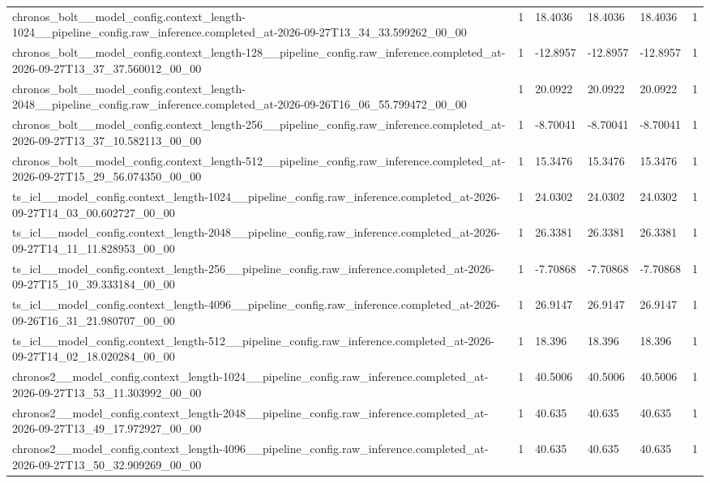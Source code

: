 \begin{tabular}{llllll}
chronos\_bolt\_\_model\_config.context\_length-1024\_\_pipeline\_config.raw\_inference.completed\_at-2026-09-27T13\_34\_33.599262\_00\_00 & 1 & 18.4036 & 18.4036 & 18.4036 & 1 \\
chronos\_bolt\_\_model\_config.context\_length-128\_\_pipeline\_config.raw\_inference.completed\_at-2026-09-27T13\_37\_37.560012\_00\_00 & 1 & -12.8957 & -12.8957 & -12.8957 & 1 \\
chronos\_bolt\_\_model\_config.context\_length-2048\_\_pipeline\_config.raw\_inference.completed\_at-2026-09-26T16\_06\_55.799472\_00\_00 & 1 & 20.0922 & 20.0922 & 20.0922 & 1 \\
chronos\_bolt\_\_model\_config.context\_length-256\_\_pipeline\_config.raw\_inference.completed\_at-2026-09-27T13\_37\_10.582113\_00\_00 & 1 & -8.70041 & -8.70041 & -8.70041 & 1 \\
chronos\_bolt\_\_model\_config.context\_length-512\_\_pipeline\_config.raw\_inference.completed\_at-2026-09-27T15\_29\_56.074350\_00\_00 & 1 & 15.3476 & 15.3476 & 15.3476 & 1 \\
ts\_icl\_\_model\_config.context\_length-1024\_\_pipeline\_config.raw\_inference.completed\_at-2026-09-27T14\_03\_00.602727\_00\_00 & 1 & 24.0302 & 24.0302 & 24.0302 & 1 \\
ts\_icl\_\_model\_config.context\_length-2048\_\_pipeline\_config.raw\_inference.completed\_at-2026-09-27T14\_11\_11.828953\_00\_00 & 1 & 26.3381 & 26.3381 & 26.3381 & 1 \\
ts\_icl\_\_model\_config.context\_length-256\_\_pipeline\_config.raw\_inference.completed\_at-2026-09-27T15\_10\_39.333184\_00\_00 & 1 & -7.70868 & -7.70868 & -7.70868 & 1 \\
ts\_icl\_\_model\_config.context\_length-4096\_\_pipeline\_config.raw\_inference.completed\_at-2026-09-26T16\_31\_21.980707\_00\_00 & 1 & 26.9147 & 26.9147 & 26.9147 & 1 \\
ts\_icl\_\_model\_config.context\_length-512\_\_pipeline\_config.raw\_inference.completed\_at-2026-09-27T14\_02\_18.020284\_00\_00 & 1 & 18.396 & 18.396 & 18.396 & 1 \\
chronos2\_\_model\_config.context\_length-1024\_\_pipeline\_config.raw\_inference.completed\_at-2026-09-27T13\_53\_11.303992\_00\_00 & 1 & 40.5006 & 40.5006 & 40.5006 & 1 \\
chronos2\_\_model\_config.context\_length-2048\_\_pipeline\_config.raw\_inference.completed\_at-2026-09-27T13\_49\_17.972927\_00\_00 & 1 & 40.635 & 40.635 & 40.635 & 1 \\
chronos2\_\_model\_config.context\_length-4096\_\_pipeline\_config.raw\_inference.completed\_at-2026-09-27T13\_50\_32.909269\_00\_00 & 1 & 40.635 & 40.635 & 40.635 & 1 \\

\end{tabular}
